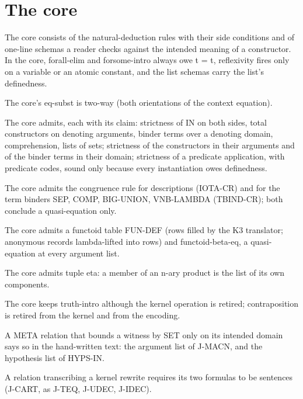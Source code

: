 \section*{The core}
\begin{description}[style=nextline,leftmargin=1.4cm]
\item[DS-40]\label{ds:40} The core consists of the natural-deduction rules with their side conditions and of one-line schemas a reader checks against the intended meaning of a constructor. In the core, forall-elim and forsome-intro always owe t = t, reflexivity fires only on a variable or an atomic constant, and the list schemas carry the list's definedness.
\item[DS-41]\label{ds:41} The core's eq-subst is two-way (both orientations of the context equation).
\item[DS-42]\label{ds:42} The core admits, each with its claim: strictness of IN on both sides, total constructors on denoting arguments, binder terms over a denoting domain, comprehension, lists of sets; strictness of the constructors in their arguments and of the binder terms in their domain; strictness of a predicate application, with predicate codes, sound only because every instantiation owes definedness.
\item[DS-43]\label{ds:43} The core admits the congruence rule for descriptions (IOTA-CR) and for the term binders SEP, COMP, BIG-UNION, VNB-LAMBDA (TBIND-CR); both conclude a quasi-equation only.
\item[DS-44]\label{ds:44} The core admits a functoid table FUN-DEF (rows filled by the K3 translator; anonymous records lambda-lifted into rows) and functoid-beta-eq, a quasi-equation at every argument list.
\item[DS-45]\label{ds:45} The core admits tuple eta: a member of an n-ary product is the list of its own components.
\item[DS-46]\label{ds:46} The core keeps truth-intro although the kernel operation is retired; contraposition is retired from the kernel and from the encoding.
\item[DS-47]\label{ds:47} A META relation that bounds a witness by SET only on its intended domain says so in the hand-written text: the argument list of J-MACN, and the hypothesis list of HYPS-IN.
\item[DS-48]\label{ds:48} A relation transcribing a kernel rewrite requires its two formulas to be sentences (J-CART, as J-TEQ, J-UDEC, J-IDEC).
\end{description}

